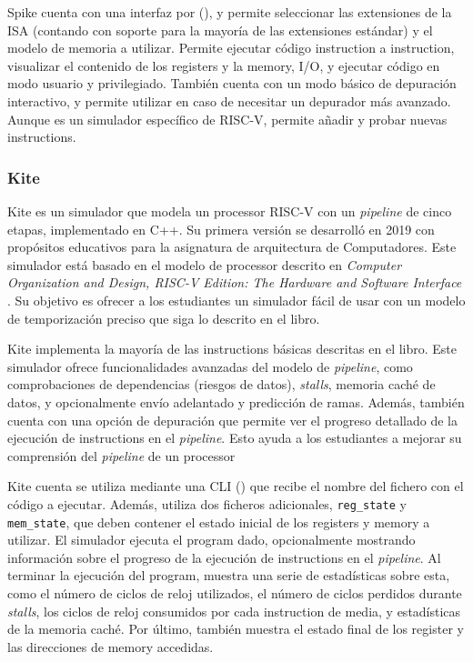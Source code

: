 Spike cuenta con una interfaz por 
(), y permite seleccionar las extensiones de la \gls{ISA}
(contando con soporte para la mayoría de las extensiones estándar) y el modelo
de memoria a utilizar. Permite ejecutar código \gls{instruction} a
\gls{instruction}, visualizar el contenido de los \glspl{register} y la
\gls{memory}, I/O, y ejecutar código en modo usuario y privilegiado. También cuenta
con un modo básico de depuración interactivo, y permite utilizar 
en caso de necesitar un depurador más avanzado. Aunque es un simulador
específico de RISC-V, permite añadir y probar nuevas \glspl{instruction}.


\subsubsection{Kite}

Kite \parencite{kite} \parencite{kite-gh} es un simulador que modela un
\gls{processor} RISC-V con un \textit{pipeline} de cinco etapas, implementado en
C++. Su primera versión se desarrolló en 2019 con propósitos educativos para la
asignatura de arquitectura de Computadores. Este simulador está basado en el
modelo de \gls{processor} descrito en \textit{Computer Organization and Design,
RISC-V Edition: The Hardware and Software Interface} \parencite{kite-book}. Su
objetivo es ofrecer a los estudiantes un simulador fácil de usar con un modelo
de temporización preciso que siga lo descrito en el libro.

Kite implementa la mayoría de las \glspl{instruction} básicas descritas en el
libro. Este simulador ofrece funcionalidades avanzadas del modelo de
\textit{pipeline}, como comprobaciones de dependencias (riesgos de datos),
\textit{stalls}, memoria caché de datos, y opcionalmente envío adelantado y
predicción de ramas. Además, también cuenta con una opción de depuración que
permite ver el progreso detallado de la ejecución de \glspl{instruction} en el
\textit{pipeline}. Esto ayuda a los estudiantes a mejorar su comprensión del
\textit{pipeline} de un \gls{processor}

Kite cuenta se utiliza mediante una \gls{CLI} () que recibe el
nombre del fichero con el código  a ejecutar.
Además, utiliza dos ficheros adicionales, \verb!reg_state! y \verb!mem_state!,
que deben contener el estado inicial de los \glspl{register} y \gls{memory} a
utilizar. El simulador ejecuta el \gls{program} dado, opcionalmente mostrando
información sobre el progreso de la ejecución de \glspl{instruction} en el
\textit{pipeline}. Al terminar la ejecución del \gls{program}, muestra una serie
de estadísticas sobre esta, como el número de ciclos de reloj utilizados, el
número de ciclos perdidos durante \textit{stalls}, los ciclos de reloj
consumidos por cada \gls{instruction} de media, y estadísticas de la memoria
caché. Por último, también muestra el estado final de los \gls{register} y las
direcciones de \gls{memory} accedidas.

